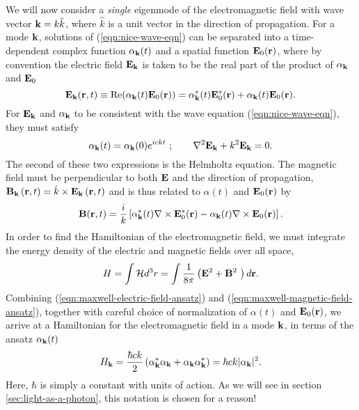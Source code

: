 \newcommand{\kmode}{\vk}
\newcommand{\alphak}{\alpha_{\kmode}}
We will now consider a \emph{single} eigenmode of the electromagnetic field with wave vector $\mathbf{k} = k \hat{k}$, where $\hat{k}$ is a unit vector in the direction of propagation.
For a mode $\mathbf{k}$, solutions of (\ref{eqn:nice-wave-eqn}) can be separated into a time-dependent complex function $\alphak(t)$ and a spatial function $\mathbf{E}_0(\mathbf{r})$, where by convention the electric field $\mathbf{E}_{\mathbf{k}}$ is taken to be the real part of the product of $\alphak$ and $\mathbf{E}_0$
\begin{equation}
    \efield_\vk(\vr, t) \equiv \mathrm{Re}(\alphak (t) \efield_0 (\vr)) = \alphak^*(t) \efield_0^* (\vr) + \alphak(t) \efield_0(\vr).
    \label{eqn:maxwell-electric-field-ansatz}
\end{equation}
For $\mathbf{E}_{\mathbf{k}}$ and $\alphak$ to be consistent with the wave equation (\ref{eqn:nice-wave-eqn}), they must satisfy
\begin{equation}
\alphak(t) = \alphak(0)e^{ickt}~;\qquad \nabla^2\efield_\vk + k^2\efield_\vk = 0.
\label{eqn:helmholtz}
\end{equation}
The second of these two expressions is the Helmholtz equation. 
%
The magnetic field must be perpendicular to both $\mathbf{E}$ and the direction of propagation, 
$\mathbf{B}_{\mathbf{k}} \left( \mathbf{r}, t \right) = \hat{k} \times \mathbf{E}_{\mathbf{k}} \left( \mathbf{r}, t \right)$
and is thus related to $\alpha(t)$ and $\mathbf{E}_0(\mathbf{r})$ by
\begin{equation}
    \bfield(\vr, t) = \frac{i}{k} 
    \left[ 
    \alphak^* (t) \nabla \times \efield_0^* (\vr) - 
    \alphak (t) \nabla \times \efield_0 (\vr)
    \right].
    \label{eqn:maxwell-magnetic-field-ansatz}
\end{equation}
In order to find the Hamiltonian of the electromagnetic field, we must integrate the energy density of the electric and magnetic fields over all space,
\begin{equation}
   H = \int \mathcal{H} d^3 r = \int \frac{1}{8\pi} \left(\mathbf{E}^2 +\mathbf{B}^2\ \right) d\mathbf{r}.
   \label{eqn:em-hamiltonian-integrate}
\end{equation}
Combining (\ref{eqn:maxwell-electric-field-ansatz}) and (\ref{eqn:maxwell-magnetic-field-ansatz}), together with careful choice of normalization of $\alpha(t)$ and $\mathbf{E}_0(\mathbf{r})$, we arrive at a Hamiltonian for the electromagnetic field in a mode $\mathbf{k}$, in terms of the ansatz $\alphak(t)$ 
\begin{equation}
   H_\vk = \frac{\hbar c k}{2} \left( \alphak^* \alphak + \alphak \alphak^*\right)
   =\hbar c k |\alphak|^2 .
   \label{eqn:maxwell-hamiltonian-ansatz}
\end{equation}
Here, $\hbar$ is simply a constant with units of action. As we will see in section \ref{sec:light-as-a-photon}, this notation is chosen for a reason!



